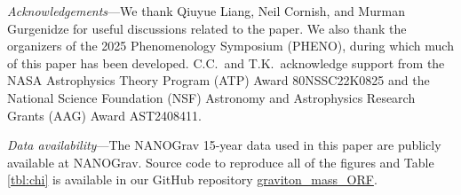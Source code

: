 \documentclass[prd,twocolumn,aps,psfig,nofootinbib,nobibnotes,superscriptaddress,preprintnumbers,times]{revtex4-2}
\begin{document}
\vspace{5mm}
\textit{Acknowledgements}---We thank Qiuyue Liang, Neil Cornish, and Murman Gurgenidze for useful discussions related to the paper. We also thank the organizers of the 2025 Phenomenology Symposium (PHENO), during which much of this paper has been developed. C.C.\ and T.K.\ acknowledge support from the NASA Astrophysics Theory Program (ATP) Award 80NSSC22K0825 and the National Science Foundation (NSF) Astronomy and Astrophysics Research Grants (AAG) Award AST2408411.

\vspace{5mm}
\textit{Data availability}---The NANOGrav 15-year data used in this paper are publicly available at NANOGrav. Source code to reproduce all of the figures and Table \ref{tbl:chi} is available in our GitHub repository \href{https://github.com/ChrisChoi314/graviton_mass_ORF}{graviton\_mass\_ORF}.





\clearpage
\end{document}
